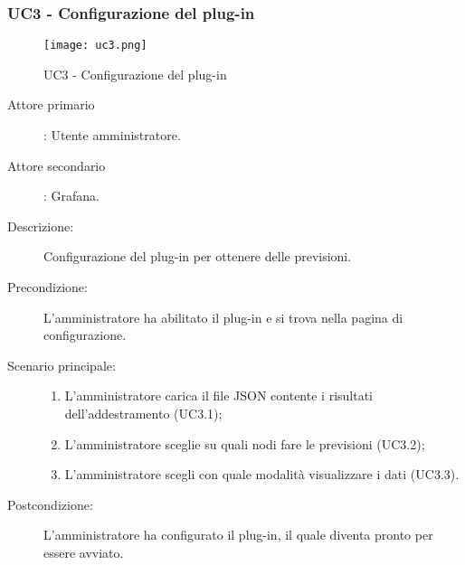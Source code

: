 \newpage
\subsubsection{UC3 - Configurazione del plug-in}
\label{sssec:uc3}

\begin{figure}[h!]
  \begin{center}
    \texttt{[image: uc3.png]}\\
    \caption{UC3 - Configurazione del plug-in}%
    \label{fig:uc3}
  \end{center}
  \end{figure}

\begin{description}
  \item[Attore primario]: Utente amministratore.
  \item[Attore secondario]: Grafana.
  \item[Descrizione:] Configurazione del plug-in per ottenere delle previsioni.
  \item[Precondizione:] L'amministratore ha abilitato il plug-in e si trova nella pagina di configurazione.
  \item[Scenario principale:]
  \begin{enumerate}
    \item L'amministratore carica il file JSON contente i risultati dell'addestramento (UC3.1);
    \item L'amministratore sceglie su quali nodi fare le previsioni (UC3.2);
    \item L'amministratore scegli con quale modalità visualizzare i dati (UC3.3).
  \end{enumerate}
  \item[Postcondizione:] L'amministratore ha configurato il plug-in, il quale diventa pronto per essere avviato.
\end{description}

